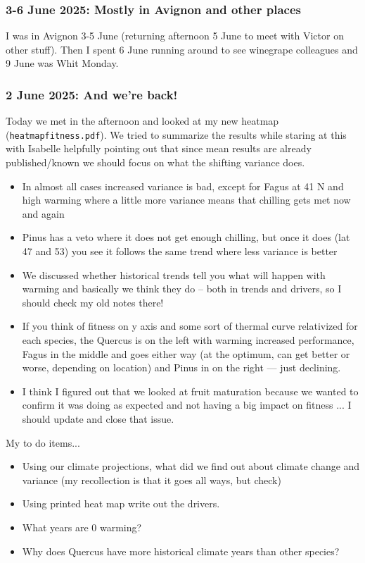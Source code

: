 \documentclass[11pt,letter]{article}
\begin{document}
\subsubsection{3-6 June 2025: Mostly in Avignon and other places}

I was in Avignon 3-5 June (returning afternoon 5 June to meet with Victor on other stuff). Then I spent 6 June running around to see winegrape colleagues and 9 June was Whit Monday.

\subsubsection{2 June 2025: And we're back!}

Today we met in the afternoon and looked at my new heatmap (\verb|heatmapfitness.pdf|). We tried to summarize the results while staring at this with Isabelle helpfully pointing out that since mean results are already published/known we should focus on what the shifting variance does. 

\begin{itemize}
\item In almost all cases increased variance is bad, except for Fagus at 41 N and high warming where a little more variance means that chilling gets met now and again
\item Pinus has a veto where it does not get enough chilling, but once it does (lat 47 and 53) you see it follows the same trend where less variance is better
\item We discussed whether historical trends tell you what will happen with warming and basically we think they do -- both in trends and drivers, so I should check my old notes there!
\item If you think of fitness on y axis and some sort of thermal curve relativized for each species, the Quercus is on the left with warming increased performance, Fagus in the middle and goes either way (at the optimum, can get better or worse, depending on location) and Pinus in on the right --- just declining. 
\item I think I figured out that we looked at fruit maturation because we wanted to confirm it was doing as expected and not having a big impact on fitness ... I should update and close that issue. 
\end{itemize}

My to do items...
\begin{itemize}
\item Using our climate projections, what did we find out about climate change and variance (my recollection is that it goes all ways, but check)
\item Using printed heat map write out the drivers. 
\item What years are 0 warming?
\item Why does Quercus have more historical climate years than other species?
\end{itemize}
\end{document}
